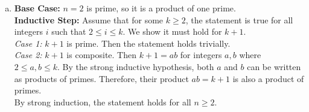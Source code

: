 \documentclass[12pt]{article}
\begin{document}
\begin{enumerate}[(a)]
\item
\textbf{Base Case:} $n=2$ is prime, so it is a product of one prime. \\
\textbf{Inductive Step:} Assume that for some $k \geq 2$, the statement is true for all integers $i$ such that $2 \leq i \leq k$. We show it must hold for $k+1$. \\
\textit{Case 1:} $k+1$ is prime. Then the statement holds trivially. \\
\textit{Case 2:} $k+1$ is composite. Then $k+1 = ab$ for integers $a, b$ where $2 \leq a, b \leq k$. By the strong inductive hypothesis, both $a$ and $b$ can be written as products of primes. Therefore, their product $ab = k+1$ is also a product of primes. \\
By strong induction, the statement holds for all $n \geq 2$.

\end{enumerate}
\end{document}
